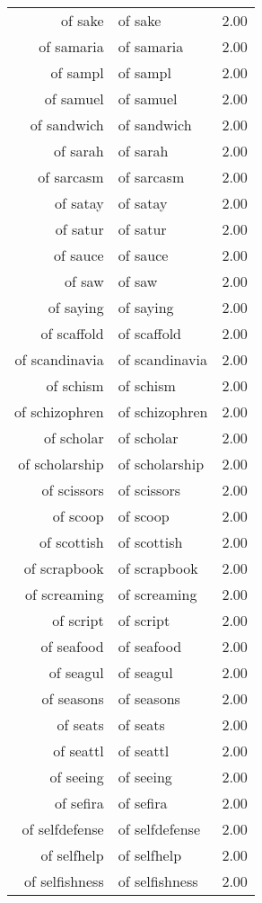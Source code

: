 \begin{table}[ht]
\begin{tabular}{rlr}
  of sake & of sake & 2.00 \\ 
  of samaria & of samaria & 2.00 \\ 
  of sampl & of sampl & 2.00 \\ 
  of samuel & of samuel & 2.00 \\ 
  of sandwich & of sandwich & 2.00 \\ 
  of sarah & of sarah & 2.00 \\ 
  of sarcasm & of sarcasm & 2.00 \\ 
  of satay & of satay & 2.00 \\ 
  of satur & of satur & 2.00 \\ 
  of sauce & of sauce & 2.00 \\ 
  of saw & of saw & 2.00 \\ 
  of saying & of saying & 2.00 \\ 
  of scaffold & of scaffold & 2.00 \\ 
  of scandinavia & of scandinavia & 2.00 \\ 
  of schism & of schism & 2.00 \\ 
  of schizophren & of schizophren & 2.00 \\ 
  of scholar & of scholar & 2.00 \\ 
  of scholarship & of scholarship & 2.00 \\ 
  of scissors & of scissors & 2.00 \\ 
  of scoop & of scoop & 2.00 \\ 
  of scottish & of scottish & 2.00 \\ 
  of scrapbook & of scrapbook & 2.00 \\ 
  of screaming & of screaming & 2.00 \\ 
  of script & of script & 2.00 \\ 
  of seafood & of seafood & 2.00 \\ 
  of seagul & of seagul & 2.00 \\ 
  of seasons & of seasons & 2.00 \\ 
  of seats & of seats & 2.00 \\ 
  of seattl & of seattl & 2.00 \\ 
  of seeing & of seeing & 2.00 \\ 
  of sefira & of sefira & 2.00 \\ 
  of selfdefense & of selfdefense & 2.00 \\ 
  of selfhelp & of selfhelp & 2.00 \\ 
  of selfishness & of selfishness & 2.00 \\ 

\end{tabular}
\end{table}
